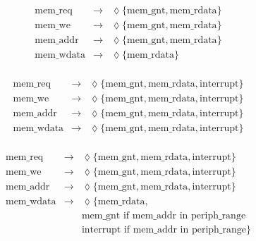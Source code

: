 \begin{equation}
\label{dict:contract_cache_nointerrupt}
\begin{array}{rcl}
\text{mem\_req} & \rightarrow & \lozenge \{ \text{mem\_gnt}, \text{mem\_rdata}\} \\
\text{mem\_we} & \rightarrow & \lozenge \{ \text{mem\_gnt}, \text{mem\_rdata}\} \\
\text{mem\_addr} & \rightarrow & \lozenge \{ \text{mem\_gnt}, \text{mem\_rdata}\} \\
\text{mem\_wdata} & \rightarrow & \lozenge \{ \text{mem\_rdata} \} \\
\end{array}
\end{equation}

\begin{equation}
\label{dict:contract_cache_interrupt}
\begin{array}{rcl}
\text{mem\_req} & \rightarrow & \lozenge \{ \text{mem\_gnt}, \text{mem\_rdata}, \text{interrupt}\} \\
\text{mem\_we} & \rightarrow & \lozenge \{ \text{mem\_gnt}, \text{mem\_rdata}, \text{interrupt}\} \\
\text{mem\_addr} & \rightarrow & \lozenge \{ \text{mem\_gnt}, \text{mem\_rdata}, \text{interrupt}\} \\
\text{mem\_wdata} & \rightarrow & \lozenge \{ \text{mem\_gnt}, \text{mem\_rdata}, \text{interrupt} \} \\
\end{array}
\end{equation}

\begin{equation}
\label{dict:contract_cache_interrupt_addressdependent}
\begin{array}{rcl}
\text{mem\_req}  & \rightarrow & \lozenge \{ \text{mem\_gnt}, \text{mem\_rdata}, \text{interrupt}\} \\
\text{mem\_we}  & \rightarrow & \lozenge \{ \text{mem\_gnt}, \text{mem\_rdata}, \text{interrupt}\} \\
\text{mem\_addr} & \rightarrow & \lozenge \{ \text{mem\_gnt}, \text{mem\_rdata}, \text{interrupt}\} \\
\text{mem\_wdata} & \rightarrow & \lozenge \{ \text{mem\_rdata}, \\
& & \text{mem\_gnt if mem\_addr in periph\_range} \\
& & \text{interrupt if mem\_addr in periph\_range} \} \\

\end{array}
\end{equation}

